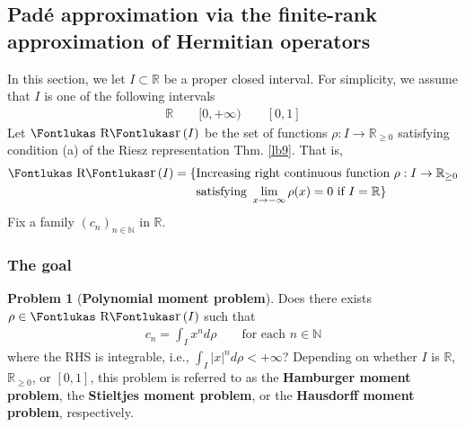 \documentclass[12pt,b5paper,notitlepage]{article}
\theoremstyle{definition}
\newtheorem{problem}[df]{Problem}
\theoremstyle{plain}
\DeclareMathOperator{\Rr}{\text{\Fontlukas R}\text{\kern -0pt {\Fontlukas\large r}}\,}
\newcommand{\Nbb}{\mathbb N}
\newcommand{\Rbb}{\mathbb R}
\numberwithin{equation}{section}
\begin{document}
\subsection{Pad\'e approximation via the finite-rank approximation of Hermitian operators}\label{lb188}



In this section, we let $I\subset\Rbb$ be a proper closed interval. For simplicity, we assume that $I$ is one of the following intervals
\begin{align*}
\Rbb\qquad [0,+\infty)\qquad [0,1]
\end{align*} 
Let $\Rr(I)$ \index{Rr@$\Rr(I)$} be the set of functions $\rho:I\rightarrow\Rbb_{\geq0}$ satisfying condition (a) of the Riesz representation Thm. \ref{lb9}. That is,
\begin{align}\label{eq100}
\begin{aligned}
\Rr(I)=\{&\text{Increasing right continuous function }\rho:I\rightarrow\Rbb_{\geq0}\\
&\text{satisfying }\lim_{x\rightarrow-\infty}\rho(x)=0\text{ if }I=\Rbb\}
\end{aligned}
\end{align}
Fix a family $(c_n)_{n\in\Nbb}$ in $\Rbb$. 

\subsubsection{The goal}



\begin{problem}[\textbf{Polynomial moment problem}] \label{lb162}
Does there exists $\rho\in\Rr(I)$ such that
\begin{align}\label{eq79}
c_n=\int_I x^nd\rho\qquad\text{for each $n\in\Nbb$}
\end{align}
where the RHS is integrable, i.e., $\int_I |x|^nd\rho<+\infty$? Depending on whether $I$ is $\Rbb$, $\Rbb_{\geq0}$, or $[0,1]$, this problem is referred to as the \textbf{Hamburger moment problem},  the \textbf{Stieltjes moment problem},  or the \textbf{Hausdorff moment problem},  respectively.
\end{problem}
\end{document}
